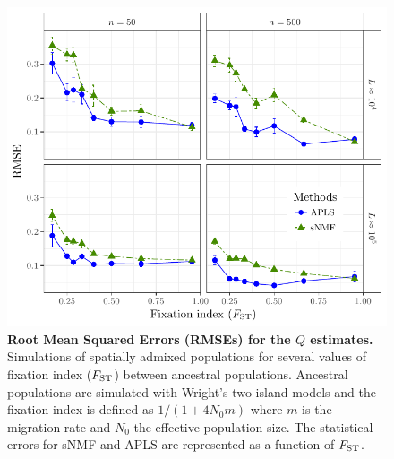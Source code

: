\begin{figure}
  \centering
  \includegraphics[width=\textwidth]{./Figures/figure2.pdf}
  \caption{{\bf Root Mean Squared Errors (RMSEs) for the $Q$ estimates.}
    Simulations of spatially admixed populations for several values of fixation
    index ($F_{\rm ST}$) between ancestral populations. Ancestral populations
    are simulated with Wright's two-island models and the fixation index is
    defined as $1 / (1 + 4 N_0 m)$ where $m$ is the migration rate and $N_0$ the
    effective population size. The statistical errors for sNMF and APLS are
    represented as a function of $F_{\rm ST}$. }
  \label{fig:fig2}
\end{figure}  

\clearpage 
\newpage

